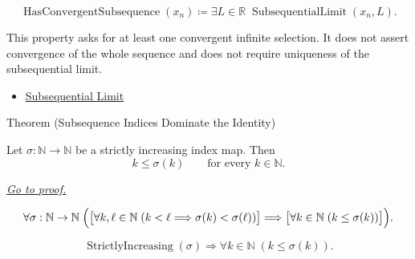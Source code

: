 \begin{remark*}
\[
\operatorname{HasConvergentSubsequence}(x_n)
\coloneqq
\exists L\in\mathbb{R}\;\operatorname{SubsequentialLimit}(x_n,L).
\]
\end{remark*}

\begin{remark*}[Interpretation]
This property asks for at least one convergent infinite selection. It does not
assert convergence of the whole sequence and does not require uniqueness of
the subsequential limit.
\end{remark*}

\begin{dependencies}
\begin{itemize}
  \item \hyperref[def:subsequential-limit]{Subsequential Limit}
\end{itemize}
\end{dependencies}


\begin{theorembox}{Theorem (Subsequence Indices Dominate the Identity)}
\begin{theorem}
\label{thm:subsequence-indices-dominate-identity}
Let $\sigma:\mathbb{N}\to\mathbb{N}$ be a strictly increasing index map.
Then
\[
  k\le \sigma(k)
  \qquad
  \text{for every } k\in\mathbb{N}.
\]

\smallskip
\noindent
\hyperref[prf:subsequence-indices-dominate-identity]{\textit{Go to proof.}}
\end{theorem}
\end{theorembox}

\begin{remark*}
\[
\forall \sigma:\mathbb{N}\to\mathbb{N}\;
\Bigl(
  \bigl[\forall k,\ell\in\mathbb{N}\;(k<\ell\Longrightarrow \sigma(k)<\sigma(\ell))\bigr]
  \Longrightarrow
  \bigl[\forall k\in\mathbb{N}\;(k\le\sigma(k))\bigr]
\Bigr).
\]
\end{remark*}

\begin{remark*}
\[
\operatorname{StrictlyIncreasing}(\sigma)
\Longrightarrow
\forall k\in\mathbb{N}\;(k\le\sigma(k)).
\]
\end{remark*}

